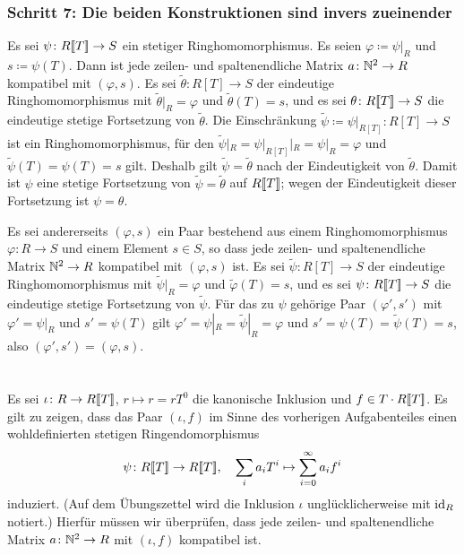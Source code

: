\documentclass[a4paper, 10pt, numbers=noenddot]{scrartcl}
\begin{document}
\subsubsection*{Schritt 7: Die beiden Konstruktionen sind invers zueinender}
Es sei $\psi \colon R[\![T]\!] \to S$ ein stetiger Ringhomomorphismus.
Es seien $\varphi \coloneqq \psi|_R$ und $s \coloneqq \psi(T)$.
Dann ist jede zeilen- und spaltenendliche Matrix $a \colon \mathbb{N}^2 \to R$ kompatibel mit $(\varphi, s)$.
Es sei $\tilde{\theta} \colon R[T] \to S$ der eindeutige Ringhomomorphismus mit $\tilde{\theta}|_R = \varphi$ und $\tilde{\theta}(T) = s$, und es sei $\theta \colon R[\![T]\!] \to S$ die eindeutige stetige Fortsetzung von $\tilde{\theta}$.
Die Einschränkung $\tilde{\psi} \coloneqq \psi|_{R[T]} \colon R[T] \to S$ ist ein Ringhomomorphismus, für den $\tilde{\psi}|_R = \psi|_{R[T]}|_R = \psi|_R = \varphi$ und $\tilde{\psi}(T) = \psi(T) = s$ gilt.
Deshalb gilt $\tilde{\psi} = \tilde{\theta}$ nach der Eindeutigkeit von $\tilde{\theta}$.
Damit ist $\psi$ eine stetige Fortsetzung von $\tilde{\psi} = \tilde{\theta}$ auf $R[\![T]\!]$; wegen der Eindeutigkeit dieser Fortsetzung ist $\psi = \theta$.

Es sei andererseits $(\varphi, s)$ ein Paar bestehend aus einem Ringhomomorphismus $\varphi \colon R \to S$ und einem Element $s \in S$, so dass jede zeilen- und spaltenendliche Matrix $\mathbb{N}^2 \to R$ kompatibel mit $(\varphi, s)$ ist.
Es sei $\tilde{\psi} \colon R[T] \to S$ der eindeutige Ringhomomorphismus mit $\tilde{\psi}|_R = \varphi$ und $\tilde{\varphi}(T) = s$, und es sei $\psi \colon R[\![T]\!] \to S$ die eindeutige stetige Fortsetzung von $\tilde{\psi}$.
Für das zu $\psi$ gehörige Paar $(\varphi', s')$ mit $\varphi' = \psi|_R$ und $s' = \psi(T)$ gilt $\varphi' = \psi|_R = \tilde{\psi}|_R = \varphi$ und $s' = \psi(T) = \tilde{\psi}(T) = s$, also $(\varphi', s') = (\varphi, s)$.





\section{}

Es sei $\iota \colon R \to R[\![T]\!]$, $r \mapsto r = r T^0$ die kanonische Inklusion und $f \in T \cdot R[\![T]\!]$.
Es gilt zu zeigen, dass das Paar $(\iota, f)$ im Sinne des vorherigen Aufgabenteiles einen wohldefinierten stetigen Ringendomorphismus
\[
  \psi \colon R[\![T]\!] \to R[\![T]\!],
  \quad
  \sum_i a_i T^i \mapsto \sum_{i=0}^\infty a_i f^i
\]
induziert.
(Auf dem Übungszettel wird die Inklusion $\iota$ unglücklicherweise mit $\operatorname{id}_R$ notiert.)
Hierfür müssen wir überprüfen, dass jede zeilen- und spaltenendliche Matrix $a \colon \mathbb{N}^2 \to R$ mit $(\iota, f)$ kompatibel ist.
\end{document}
